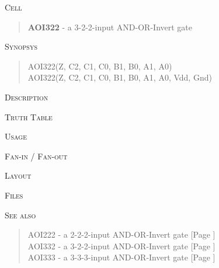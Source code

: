 
\label{AOI322}
\textsc{Cell}
\begin{quote}
    \textbf{AOI322} - a 3-2-2-input AND-OR-Invert gate
\end{quote}

\textsc{Synopsys}
\begin{quote}
    AOI322(Z, C2, C1, C0, B1, B0, A1, A0) \\
    AOI322(Z, C2, C1, C0, B1, B0, A1, A0, Vdd, Gnd)
\end{quote}

\textsc{Description}

%

\textsc{Truth Table}


\textsc{Usage}

\textsc{Fan-in / Fan-out}

\textsc{Layout}

\textsc{Files}

\textsc{See also}
\begin{quote}
    AOI222 - a 2-2-2-input AND-OR-Invert gate [Page \pageref{AOI222}] \\
    AOI332 - a 3-2-2-input AND-OR-Invert gate [Page \pageref{AOI332}] \\
    AOI333 - a 3-3-3-input AND-OR-Invert gate [Page \pageref{AOI333}]
\end{quote}
